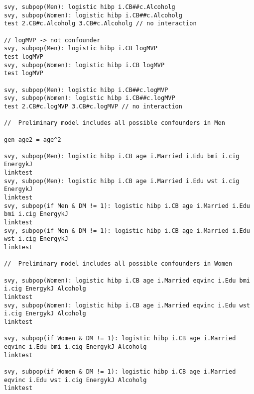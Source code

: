 \documentclass[]{article}
\begin{document}
\begin{verbatim}
svy, subpop(Men): logistic hibp i.CB##c.Alcoholg
svy, subpop(Women): logistic hibp i.CB##c.Alcoholg
test 2.CB#c.Alcoholg 3.CB#c.Alcoholg // no interaction

// logMVP -> not confounder 
svy, subpop(Men): logistic hibp i.CB logMVP
test logMVP
svy, subpop(Women): logistic hibp i.CB logMVP
test logMVP

svy, subpop(Men): logistic hibp i.CB##c.logMVP
svy, subpop(Women): logistic hibp i.CB##c.logMVP
test 2.CB#c.logMVP 3.CB#c.logMVP // no interaction

//  Preliminary model includes all possible confounders in Men

gen age2 = age^2

svy, subpop(Men): logistic hibp i.CB age i.Married i.Edu bmi i.cig EnergykJ 
linktest
svy, subpop(Men): logistic hibp i.CB age i.Married i.Edu wst i.cig EnergykJ 
linktest
svy, subpop(if Men & DM != 1): logistic hibp i.CB age i.Married i.Edu bmi i.cig EnergykJ 
linktest
svy, subpop(if Men & DM != 1): logistic hibp i.CB age i.Married i.Edu wst i.cig EnergykJ 
linktest

//  Preliminary model includes all possible confounders in Women

svy, subpop(Women): logistic hibp i.CB age i.Married eqvinc i.Edu bmi i.cig EnergykJ Alcoholg 
linktest
svy, subpop(Women): logistic hibp i.CB age i.Married eqvinc i.Edu wst i.cig EnergykJ Alcoholg 
linktest

svy, subpop(if Women & DM != 1): logistic hibp i.CB age i.Married eqvinc i.Edu bmi i.cig EnergykJ Alcoholg
linktest

svy, subpop(if Women & DM != 1): logistic hibp i.CB age i.Married eqvinc i.Edu wst i.cig EnergykJ Alcoholg
linktest
\end{verbatim}
\end{document}
